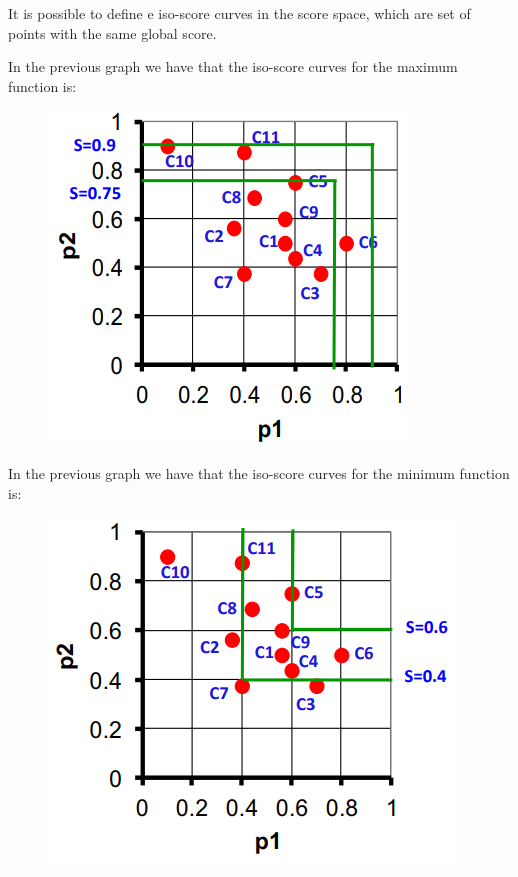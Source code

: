 \documentclass[12pt, a4paper]{report}
\newtheorem[style=M,bodystyle=\normalfont]{theorem}{Theorem}
\newtheorem[style=M,bodystyle=\normalfont]{corollary}{Corollary}
\newtheorem[style=M,bodystyle=\normalfont]{lemma}{Lemma}
\newtheorem[style=M,bodystyle=\normalfont]{definition}{Definition}
\begin{document}
    It is possible to define e iso-score curves in the score space, which are set of points with the same global score. 
    \begin{example}
        In the previous graph we have that the iso-score curves for the maximum function is: 
        \begin{figure}[H]
            \centering
            \includegraphics[width=0.3\linewidth]{images/iso.png}
        \end{figure}
        In the previous graph we have that the iso-score curves for the minimum function is: 
        \begin{figure}[H]
            \centering
            \includegraphics[width=0.3\linewidth]{images/isomin.png}
        \end{figure}
    \end{example}
\end{document}
